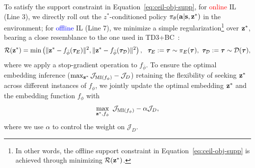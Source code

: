 To satisfy the support constraint in Equation~\ref{eq:ceil-obj-supp}, for \textcolor{red}{online} IL (Line 3), we directly roll out the $z^*$-conditioned policy $\pi_\theta(\mathbf{a}|\mathbf{s},{\mathbf{z}}^*)$ in the environment; for \textcolor{blue}{offline} IL (Line 7), we minimize a simple regularization\footnote{In other words, the offline support constraint in Equation~\ref{eq:ceil-obj-supp} is achieved through minimizing $\mathcal{R}({\mathbf{z}}^*)$.} over ${\mathbf{z}}^*$, bearing a close resemblance to the one used in TD3+BC~\citep{fujimoto2021minimalist}:  
\begin{align}\label{eq:ceil-stop-grad}
    \mathcal{R}({\mathbf{z}}^*) = \min \left( \Vert {\mathbf{z}}^* - f_{\bar{\phi}}({\bm{\tau}}_E)\Vert^2 ,
     \Vert {\mathbf{z}}^* - f_{\bar{\phi}}({\bm{\tau}}_\mathcal{D})\Vert^2 
 \right), \ \ {\bm{\tau}}_E:={\bm{\tau}} \sim \pi_E({\bm{\tau}}), \  {\bm{\tau}}_\mathcal{D}:={\bm{\tau}} \sim \mathcal{D}({\bm{\tau}}), 
\end{align}
where we apply a stop-gradient operation to $f_{\bar{\phi}}$. 
To ensure the optimal embedding inference ($\max_{{\mathbf{z}}^*} \mathcal{J}_{\text{MI}(f_\phi)} - \mathcal{J}_{D}$) retaining the flexibility of seeking ${\mathbf{z}}^*$ across different instances of $f_\phi$, 
we jointly update the optimal embedding ${\mathbf{z}}^*$ and the embedding function $f_\phi$ with
\begin{align}\label{eq:ceil-joint-opt}
 \max_{{\mathbf{z}}^*, f_\phi} \  \mathcal{J}_{\text{MI}(f_\phi)} - \alpha \mathcal{J}_{D}, 
\end{align}
where we use $\alpha$ to control the weight on $\mathcal{J}_{D}$. 


